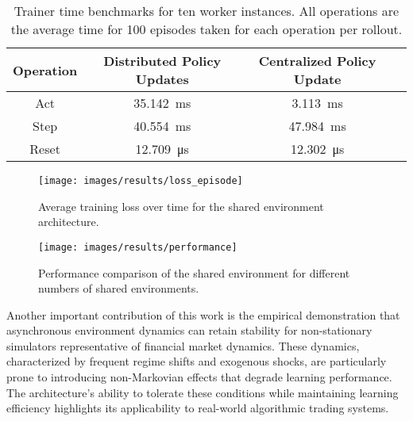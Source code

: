 \begin{table}[h!]
    \centering
    \begin{tabular}{|c|c|c|c|}
        \hline
        \textbf{Operation} & \textbf{Distributed Policy Updates} & \textbf{Centralized Policy Update} \\
        \hline

        Act & \SI{35.142}{\milli\second} & \SI{3.113}{\milli\second} \\
        Step & \SI{40.554}{\milli\second} &\SI{47.984}{\milli\second} \\
        Reset & \SI{12.709}{\micro\second} & \SI{12.302}{\micro\second} \\
        \hline
    \end{tabular}
    \caption{Trainer time benchmarks for ten worker instances. All operations are the average time for 100 episodes taken for each operation per rollout.}
    \label{tab:benchmarks}
\end{table}

\begin{figure}[htbp]
    \begin{minipage}[t]{0.48\textwidth}
        \centering
        \texttt{[image: images/results/loss\_episode]}
        \caption{Average training loss over time for the shared environment architecture.}
        \label{fig:loss}
    \end{minipage}
    \hfill
    \begin{minipage}[t]{0.48\textwidth}
        \centering
        \texttt{[image: images/results/performance]}
        \caption{Performance comparison of the shared environment for different numbers of shared environments.}
        \label{fig:performance}
    \end{minipage}
\end{figure}
Another important contribution of this work is the empirical demonstration that asynchronous environment dynamics
can retain stability for non-stationary simulators representative of financial market dynamics.
These dynamics, characterized by frequent regime shifts and exogenous shocks, are particularly prone to introducing non-Markovian effects that degrade learning performance.
The architecture’s ability to tolerate these conditions while maintaining learning efficiency highlights its applicability to real-world algorithmic trading systems.

